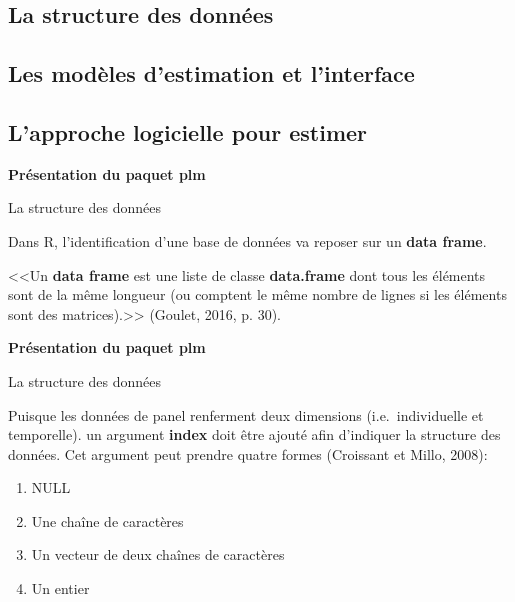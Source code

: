 \documentclass{beamer}
\begin{document}
\subsection{La structure des donn\'ees}
\subsection{Les mod\`eles d'estimation et l'interface}
\subsection{L'approche logicielle pour estimer}
\begin{frame}{\textbf{Pr\'esentation du paquet plm}}
\begin{block}{La structure des donn\'ees}
\end{block}
Dans R, l'identification d'une base de donn\'ees va reposer sur  un \textbf{data frame}. \newline

<<Un \textbf{data frame} est une liste de classe  \textbf{data.frame} dont tous les \'el\'ements sont de la m\^eme longueur (ou comptent le m\^eme nombre de lignes si les \'el\'ements sont des matrices).>> (Goulet, 2016, p. 30). 
\end{frame}
\begin{frame}{\textbf{Pr\'esentation du paquet plm}}
\begin{block}{La structure des donn\'ees}
\end{block}
Puisque les donn\'ees de panel renferment  deux dimensions (i.e.\ individuelle et temporelle). un argument \textbf{index} doit \^etre ajout\'e afin d'indiquer la structure des donn\'ees. Cet argument peut prendre quatre formes (Croissant et Millo, 2008):
\begin{enumerate}
\item NULL
\item Une cha\^ine de caract\`eres
\item Un vecteur de deux cha\^ines de caract\`eres
\item Un entier
\end{enumerate} 
\end{frame}
\end{document}
